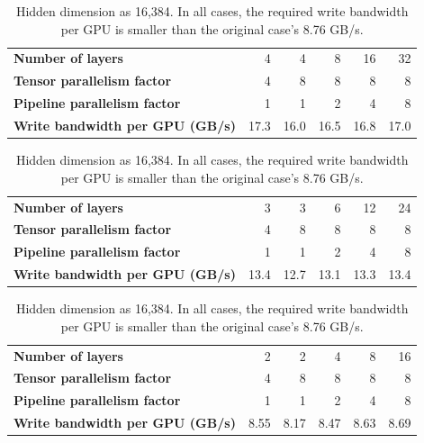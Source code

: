 \begin{table}[!htbp]
\begin{subtable}[]{\textwidth}\centering
\begin{tabular}{lrrrrr}\toprule
\textbf{Number of layers}                          & 4    & 4    & 8    & 16   & 32   \\
\textbf{Tensor   parallelism factor}               & 4    & 8    & 8    & 8    & 8    \\
\textbf{Pipeline   parallelism factor}             & 1    & 1    & 2    & 4    & 8    \\\midrule
\textbf{Write bandwidth per GPU (GB/s)}  & 17.3 & 16.0 & 16.5 & 16.8 & 17.0 \\
\bottomrule
\end{tabular}
\caption{Hidden dimension as 8,192. In all cases, the required write bandwidth per GPU is smaller than the original case's 18.0 GB/s.}
\end{subtable}\vspace{0.3cm}


\begin{subtable}[]{\textwidth}\centering
\begin{tabular}{lrrrrr}\toprule
\textbf{Number of layers}                          & 3    & 3    & 6    & 12   & 24   \\
\textbf{Tensor   parallelism factor}               & 4    & 8    & 8    & 8    & 8    \\
\textbf{Pipeline   parallelism factor}             & 1    & 1    & 2    & 4    & 8    \\\midrule
\textbf{Write bandwidth per GPU (GB/s)}  & 13.4 & 12.7 & 13.1 & 13.3 & 13.4 \\
\bottomrule
\end{tabular}
\caption{Hidden dimension as 12,288. In all cases, the required write bandwidth per GPU is smaller than the original case's 13.8 GB/s.}
\end{subtable}\vspace{0.3cm}


\begin{subtable}[]{\textwidth}\centering
\begin{tabular}{lrrrrr}\toprule
\textbf{Number of layers}                          & 2    & 2    & 4    & 8   & 16   \\
\textbf{Tensor   parallelism factor}               & 4    & 8    & 8    & 8    & 8    \\
\textbf{Pipeline   parallelism factor}             & 1    & 1    & 2    & 4    & 8    \\\midrule
\textbf{Write bandwidth per GPU (GB/s)}  & 8.55 & 8.17 & 8.47 & 8.63 & 8.69 \\
\bottomrule
\end{tabular}
\caption{Hidden dimension as 16,384. In all cases, the required write bandwidth per GPU is smaller than the original case's 8.76 GB/s.}
\end{subtable}


\end{table}
